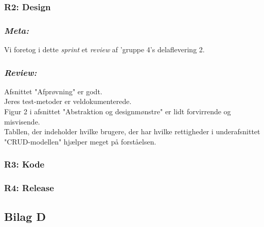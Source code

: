 \documentclass[12pt]{article}
\begin{document}
\subsubsection{R2: Design}
\subsubsection*{\textit{Meta:}}
Vi foretog i dette \textit{sprint} et \textit{review} af 'gruppe 4's delaflevering 2.

\subsubsection*{\textit{Review:}}
Afsnittet "Afprøvning" er godt. \\
Jeres test-metoder er veldokumenterede. \\
Figur 2 i afsnittet "Abstraktion og designmønstre" er lidt forvirrende og misvisende. \\
Tabllen, der indeholder hvilke brugere, der har hvilke rettigheder i underafsnittet "CRUD-modellen" hjælper meget på forståelsen.

\subsubsection{R3: Kode}
\subsubsection{R4: Release}

\newpage
\subsection{Bilag D}
\label{sec:bilag_tests}
\end{document}
